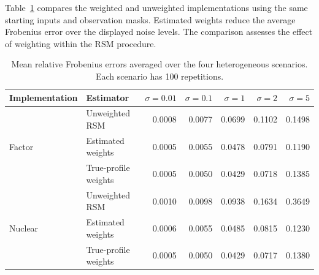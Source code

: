 \documentclass[numsec,webpdf,modern,large,namedate]{oup-authoring-template}
\theoremstyle{plain}
\theoremstyle{remark}
\begin{document}
Table~\ref{tab:supp:weight_comparison} compares the weighted and unweighted implementations using the same starting inputs and observation masks. Estimated weights reduce the average Frobenius error over the displayed noise levels. The comparison assesses the effect of weighting within the RSM procedure.
\begin{table}[!htbp]
\centering
\caption{Mean relative Frobenius errors averaged over the four heterogeneous scenarios. Each scenario has 100 repetitions.}
\label{tab:supp:weight_comparison}
\begingroup
\small
{}
\setlength{\tabcolsep}{3.2pt}
\begin{tabular}{@{}llrrrrr@{}}
\toprule
Implementation & Estimator & $\sigma=0.01$ & $\sigma=0.1$ & $\sigma=1$ & $\sigma=2$ & $\sigma=5$ \\
\midrule
\multirow{3}{*}{Factor} & Unweighted RSM & 0.0008 & 0.0077 & 0.0699 & 0.1102 & 0.1498 \\
 & Estimated weights & 0.0005 & 0.0055 & 0.0478 & 0.0791 & 0.1190 \\
 & True-profile weights & 0.0005 & 0.0050 & 0.0429 & 0.0718 & 0.1385 \\
\midrule
\multirow{3}{*}{Nuclear} & Unweighted RSM & 0.0010 & 0.0098 & 0.0938 & 0.1634 & 0.3649 \\
 & Estimated weights & 0.0006 & 0.0055 & 0.0485 & 0.0815 & 0.1230 \\
 & True-profile weights & 0.0005 & 0.0050 & 0.0429 & 0.0717 & 0.1380 \\
\bottomrule
\end{tabular}
\endgroup
\end{table}
\end{document}
